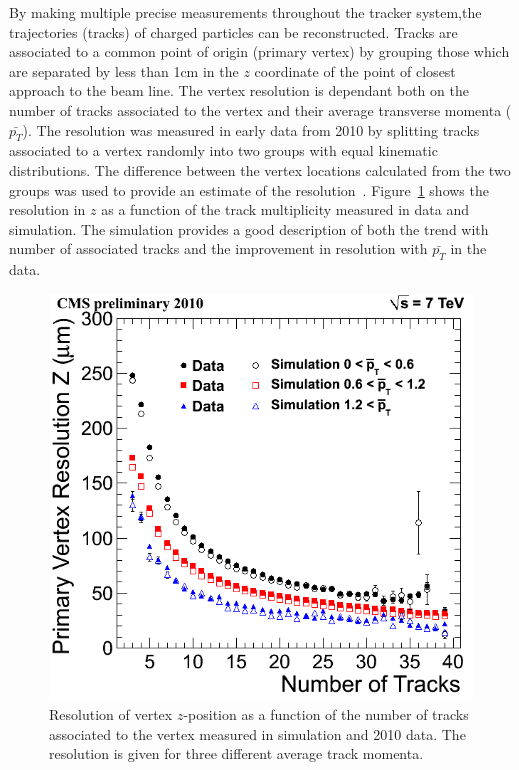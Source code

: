 By making multiple precise measurements throughout the tracker system,the trajectories (tracks) of charged 
particles can be reconstructed.
Tracks are associated to a common point of origin (primary vertex) by grouping those which are separated
by less than 1cm in the $z$ coordinate of the point of closest approach to the beam line.
The vertex resolution is dependant both on the number of tracks associated to the vertex and
their average transverse momenta ($\bar{p_{T}}$). The resolution was measured in early data from 2010
by splitting tracks associated to a vertex randomly into two groups with equal kinematic distributions.
The difference between the vertex locations calculated from the two groups was used to provide an estimate 
of the resolution~\citep{TRK-10-005}.
Figure~\ref{fig:vtxreso} shows the resolution in $z$ as a function of the track multiplicity
measured in data and simulation. The simulation provides a good description of both the trend with 
number of associated tracks and the improvement in resolution with $\bar{p_{T}}$ in the data. 

\begin{figure}
\begin{center}
	\includegraphics[width=.6\textwidth]{detector/trcker/zresotrcker.png}
	\caption{Resolution of vertex $z$-position as a function of the number 
	of tracks associated to the vertex measured in simulation and 2010 data.
 	The resolution is given for three different average track momenta.}
	\label{fig:vtxreso}
\end{center}
\end{figure}


